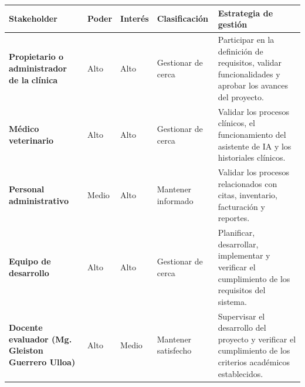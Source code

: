 \documentclass[
]{article}
\newcounter{none} %
\begin{document}
{\def\LTcaptype{none} %
\begin{longtable}[]{@{}
  >{\raggedright\arraybackslash}p{}
  >{\raggedright\arraybackslash}p{}
  >{\raggedright\arraybackslash}p{}
  >{\raggedright\arraybackslash}p{}
  >{\raggedright\arraybackslash}p{}@{}}
\toprule\noalign{}
\begin{minipage}[b]{\linewidth}\raggedright
\textbf{Stakeholder}
\end{minipage} & \begin{minipage}[b]{\linewidth}\raggedright
\textbf{Poder}
\end{minipage} & \begin{minipage}[b]{\linewidth}\raggedright
\textbf{Interés}
\end{minipage} & \begin{minipage}[b]{\linewidth}\raggedright
\textbf{Clasificación}
\end{minipage} & \begin{minipage}[b]{\linewidth}\raggedright
\textbf{Estrategia de gestión}
\end{minipage} \\
\midrule\noalign{}
\endhead
\bottomrule\noalign{}
\endlastfoot
\textbf{Propietario o administrador de la} \textbf{clínica} & Alto & Alto & Gestionar de cerca &
\begin{minipage}[t]{\linewidth}\raggedright
Participar en la definición de requisitos, validar funcionalidades y aprobar los avances del proyecto.
\end{minipage} \\
\textbf{Médico veterinario} & Alto & Alto & Gestionar de cerca &
\begin{minipage}[t]{\linewidth}\raggedright
Validar los procesos clínicos, el funcionamiento del asistente de IA y los historiales clínicos.
\end{minipage} \\
\textbf{Personal administrativo} & Medio & Alto & Mantener informado &
\begin{minipage}[t]{\linewidth}\raggedright
Validar los procesos relacionados con citas, inventario, facturación y reportes.
\end{minipage} \\
\textbf{Equipo de desarrollo} & Alto & Alto & Gestionar de cerca &
\begin{minipage}[t]{\linewidth}\raggedright
Planificar, desarrollar, implementar y verificar el cumplimiento de los requisitos del sistema.
\end{minipage} \\
\textbf{Docente evaluador (Mg. Gleiston Guerrero Ulloa)} & Alto & Medio
& Mantener satisfecho & \begin{minipage}[t]{\linewidth}\raggedright
Supervisar el desarrollo del proyecto y verificar el cumplimiento de los
criterios académicos establecidos.
\end{minipage} \\
\end{longtable}
}
\end{document}
